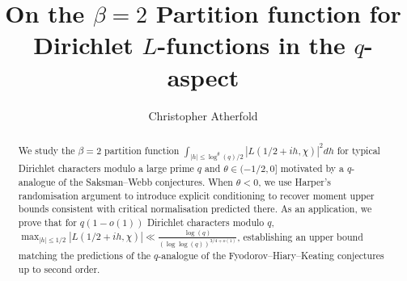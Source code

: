 \documentclass[reqno]{amsart}
\theoremstyle{definition}
\theoremstyle{remark}
\numberwithin{equation}{section}
\theoremstyle{remark}
\begin{document}
\title[Critical partition function in the $q$-aspect]{On the $\beta=2$ Partition function for Dirichlet $L$-functions in the $q$-aspect}
\author{Christopher Atherfold}
\address{School of Mathematics, University of Bristol, Bristol, BS8 1UG, United Kingdom}
\begin{abstract}
    We study the $\beta=2$ partition function $\int_{|h| \leq \log^{\theta}(q)/2}|L(1/2+ih,\chi)|^2dh$ for typical Dirichlet characters modulo a large prime $q$ and $\theta \in (-1/2,0]$ motivated by a $q$-analogue of the Saksman--Webb conjectures. When $\theta <0$, we use Harper's randomisation argument to introduce explicit conditioning to recover moment upper bounds consistent with critical normalisation predicted there. As an application, we prove that for $q(1-o(1))$ Dirichlet characters modulo $q$, $\max_{|h| \leq 1/2}|L(1/2+ih,\chi)|\ll \frac{\log(q)}{(\log\log(q))^{3/4+o(1)}}$, establishing an upper bound matching the predictions of the $q$-analogue of the Fyodorov--Hiary--Keating conjectures up to second order.
\end{abstract}
\maketitle
\end{document}
